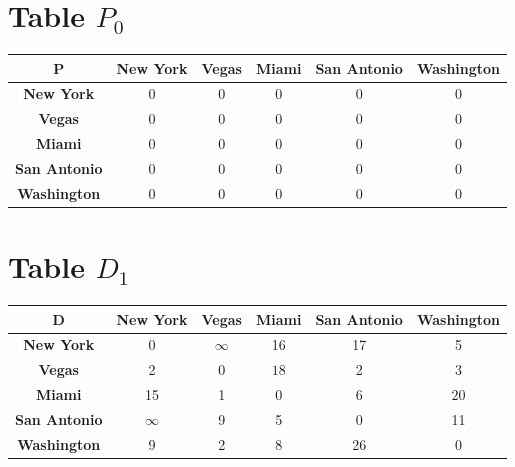 \documentclass{article}
\begin{document}
\section{Table $P_{0}$}
\begin{center}
    \begin{tabular}{|c||c|c|c|c|c|}
        \hline
        \textbf{P} & \textbf{New York} & \textbf{Vegas} & \textbf{Miami} & \textbf{San Antonio} & \textbf{Washington} \\
        \hline
        \hline
        \textbf{New York}& 0 & 0 & 0 & 0 & 0 \\
        \hline
        \textbf{Vegas}& 0 & 0 & 0 & 0 & 0 \\
        \hline
        \textbf{Miami}& 0 & 0 & 0 & 0 & 0 \\
        \hline
        \textbf{San Antonio}& 0 & 0 & 0 & 0 & 0 \\
        \hline
        \textbf{Washington}& 0 & 0 & 0 & 0 & 0 \\
        \hline
    \end{tabular}
\end{center}


\section{Table $D_{1}$}
\begin{center}
    \begin{tabular}{|c||c|c|c|c|c|}
        \hline
        \textbf{D} & \textbf{New York} & \textbf{Vegas} & \textbf{Miami} & \textbf{San Antonio} & \textbf{Washington} \\
        \hline
        \hline
        \textbf{New York}& 0 & $\infty$ & 16 & 17 & 5 \\
        \hline
        \textbf{Vegas}& 2 & 0 & \cellcolor[HTML]{D74894}$18$ & 2 & 3 \\
        \hline
        \textbf{Miami}& 15 & 1 & 0 & 6 & \cellcolor[HTML]{D74894}$20$ \\
        \hline
        \textbf{San Antonio}& $\infty$ & 9 & 5 & 0 & 11 \\
        \hline
        \textbf{Washington}& 9 & 2 & 8 & \cellcolor[HTML]{D74894}$26$ & 0 \\
        \hline
    \end{tabular}
\end{center}
\end{document}
